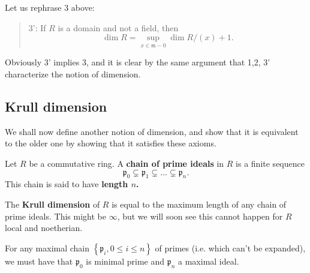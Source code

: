 Let us rephrase 3 above:
\begin{quote}
3': If $R$ is a domain and not a field, then 
\[ \dim R = \sup_{x \in \mathfrak{m} - 0} \dim R/(x) + 1. \]
\end{quote}
Obviously 3' implies 3, and it is clear by the same argument that 1,2, 3'
characterize the notion of dimension.

\subsection{Krull dimension} We shall now define another notion of
dimension, and show that it is equivalent to the older one by showing that it
satisfies these axioms.

\begin{definition} 
Let $R$ be a commutative ring. A \textbf{chain of prime ideals} in $R$ is a finite
sequence
\[ \mathfrak{p}_0 \subsetneq \mathfrak{p}_1 \subsetneq \dots \subsetneq
\mathfrak{p}_n.  \]
This chain is said to have \textbf{length $n$.}
\end{definition} 

\begin{definition} 
The \textbf{Krull dimension} of $R$ is equal to the maximum length of any chain
of prime ideals. This might be $\infty$, but we will soon see this cannot
happen for $R$ local and noetherian.
\end{definition} 

\begin{remark} 
For any maximal chain $\left\{\mathfrak{p}_i, 0 \leq i \leq n\right\}$ of primes (i.e. which can't be expanded), we must have
that $\mathfrak{p}_0$ is minimal prime and $\mathfrak{p}_n$ a maximal ideal.
\end{remark} 

